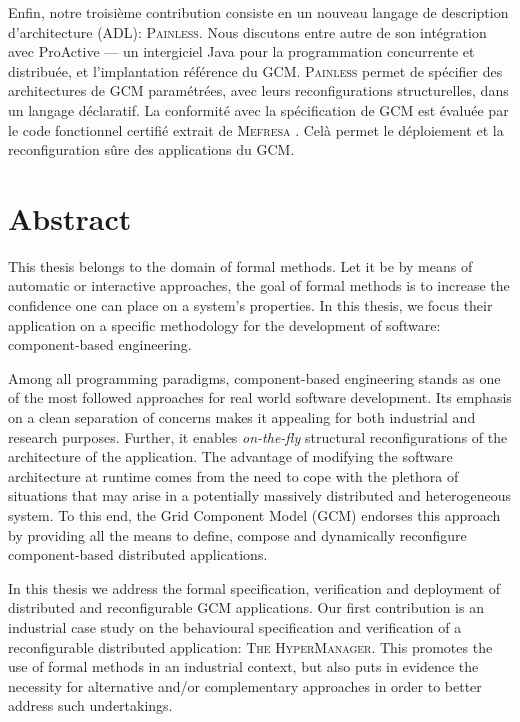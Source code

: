 Enfin, notre troisième contribution consiste en un nouveau langage de description d'architecture (ADL): 
\textsc{Painless}. Nous discutons entre autre de son intégration avec ProActive --- 
un intergiciel Java pour la programmation concurrente et distribuée, 
et l'implantation référence du GCM. 
\textsc{Painless} permet de spécifier des architectures de GCM paramétrées, avec 
leurs reconfigurations structurelles, dans un langage déclaratif. La conformité 
avec la spécification de GCM est évaluée par le code fonctionnel certifié extrait de 
\textsc{Mefresa} . Celà permet le déploiement et la
reconfiguration sûre des applications du GCM.






\chapter*{\centering Abstract}

		This thesis belongs to the domain of formal methods.  
	Let it be by means of automatic or interactive approaches, the goal of formal methods
	is to increase the confidence one can place on a system's properties.
	In this thesis, we focus 
		their application on a specific methodology
	for the development of software: component-based engineering.


		Among all programming paradigms, component-based engineering stands as one
	of the most followed approaches for real world software development. Its emphasis
	on a clean separation of concerns makes it appealing for both industrial
	and research purposes. Further, it enables \textit{on-the-fly} structural 
	reconfigurations of the architecture of the application. The advantage of modifying the software 
	architecture at runtime comes from the need to cope with the plethora of situations 
	that may arise in a potentially massively distributed and heterogeneous system.	
	To this end, the Grid Component Model (GCM) endorses this approach by providing all 
	the means to define, compose and dynamically reconfigure component-based distributed applications.
		
	
		In this thesis we address the formal specification, verification and deployment of
	distributed and reconfigurable GCM applications. Our first contribution is an industrial
	case study on the behavioural specification and verification of a reconfigurable
	distributed application: \textsc{The HyperManager}. 
	This promotes the use of formal methods in an industrial context,
    but also puts in evidence the necessity for alternative and/or complementary approaches 
	in order to better address such undertakings.		
		
